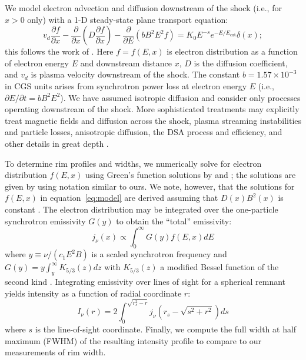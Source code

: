 \documentclass[iop, apj, numberedappendix]{emulateapj}
\newcommand*{\mt}{\mathrm}
\newcommand*{\ptl}{\partial}
\newcommand*{\Ecut}{E_{\mt{cut}}}
\begin{document}
We model electron advection and diffusion downstream of the shock (i.e., for
$x>0$ only) with a 1-D steady-state plane transport equation:
\begin{equation} \label{eq:model}
    v_d \frac{\ptl f}{\ptl x}
    - \frac{\ptl}{\ptl x} \left(D\frac{\ptl f}{\ptl x}\right)
    - \frac{\ptl}{\ptl E} \left(bB^2E^2f\right)
    = K_0 E^{-s} e^{-E/\Ecut} \delta(x) ;
\end{equation}
this follows the work of \citet{webb1984, berezhko2004, cassam-chenai2007,
morlino2010, rettig2012}.  Here $f = f(E,x)$ is electron distribution as a
function of electron energy $E$ and downstream distance $x$, $D$ is the
diffusion coefficient, and $v_d$ is plasma velocity downstream of the shock.
The constant $b = 1.57 \times 10^{-3}$ in CGS units arises from synchrotron
power loss at electron energy $E$ (i.e., $\ptl E/\ptl t = b B^2 E^2$).
We have assumed isotropic diffusion and consider only processes operating
downstream of the shock.  More sophisticated treatments may explicitly treat
magnetic fields and diffusion across the shock, plasma streaming instabilities
and particle losses, anisotropic diffusion, the DSA process and efficiency, and
other details in great depth \citep[e.g.,][and references therein]{reville2013,
bykov2014, ferrand2014}.

To determine rim profiles and widths, we numerically solve for electron
distribution $f(E,x)$ using Green's function solutions by \citet{lerche1980}
and \citet{rettig2012}; the solutions are given by 
using notation similar to ours.  We note, however, that the solutions for
$f(E,x)$ in equation~\eqref{eq:model} are derived assuming that $D(x) B^2(x)$
is constant \citep{lerche1980}.  The electron distribution may be integrated
over the one-particle synchrotron emissivity $G(y)$ to obtain the ``total''
emissivity:
\begin{equation} \label{eq:emissivity}
    j_{\nu}(x) \propto \int_0^\infty G(y) f(E,x) dE
\end{equation}
where $y \equiv \nu/(c_1 E^2 B)$ is a scaled synchrotron frequency and
$G(y) = y \int_y^\infty K_{5/3}(z) dz$ with $K_{5/3}(z)$ a modified Bessel
function of the second kind \citep{pacholczyk1970}.  Integrating emissivity
over lines of sight for a spherical remnant yields intensity as a function of
radial coordinate $r$:
\begin{equation} \label{eq:intensity}
    I_{\nu}(r) = 2 \int_0^{\sqrt{r_s^2 - r}}
                   j_{\nu} \left( r_s - \sqrt{s^2 + r^2} \right) ds
\end{equation}
where $s$ is the line-of-sight coordinate.  Finally, we compute the full width
at half maximum (FWHM) of the resulting intensity profile to compare to our
measurements of rim width.
\end{document}
